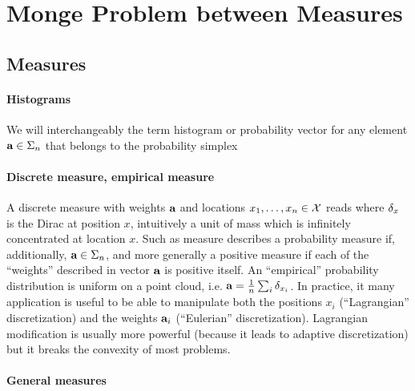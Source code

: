 
\section{Monge Problem between Measures}

\subsection{Measures}


\paragraph{Histograms}

We will interchangeably the term histogram or probability vector for any element $\mathrm{\textbf{\upshape a}} \in \Sigma_n$ that belongs to the probability simplex


\paragraph{Discrete measure, empirical measure}

A discrete measure with weights $\mathrm{\textbf{\upshape a}}$ and locations $x_1,\dots,x_n\in\mathcal{X}$ reads
where $\delta_x$ is the Dirac at position $x$, intuitively a unit of mass which is infinitely concentrated at location $x$. Such as measure describes a probability measure if, additionally, $\mathrm{\textbf{\upshape a}}\in\Sigma_n$, and more generally a positive measure if each of the ``weights'' described in vector $\mathrm{\textbf{\upshape a}}$ is positive itself. 
%
An ``empirical'' probability distribution is uniform on a point cloud, i.e. $\mathrm{\textbf{\upshape a}}=\frac{1}{n}\sum_i \delta_{x_i}$. 
%
In practice, it many application is useful to be able to manipulate both the positions $x_i$ (``Lagrangian'' discretization) and the weights $\mathrm{\textbf{\upshape a}}_i$ (``Eulerian'' discretization). Lagrangian modification is usually more powerful (because it leads to adaptive discretization) but it breaks the convexity of most problems. 


\paragraph{General measures}

